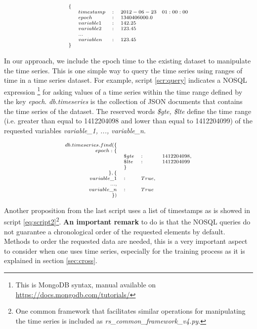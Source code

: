 \begin{equation}
\scriptsize
\label{eq:script}
\begin{array}{llcl}
\{ &  &  &  \\ 
& timestamp & : & 2012-06-23 \quad 01:00:00 \\	
& epoch & : & 1340406000.0 \\	
 & variable1 & : & 142.25 	\\	
 & variable2 & : & 123.45 	\\	
 & ... &  &  	\\	
 & variablen & : & 123.45 	\\
\} & & & \\
\end{array}
\end{equation}

In our approach, we include the epoch time to the existing dataset to manipulate the time series. This is one simple way to query the time series using ranges of time in a time series dataset. For example, script \ref{scr:query} indicates a NOSQL expression \footnote{This is MongoDB syntax, manual available on \url{https://docs.mongodb.com/tutorials/}} for asking values of a time series within the time range defined by the key \textit{epoch}. \textit{db.timeseries} is the collection of JSON documents that contains the time series of the dataset. The reserved words \textit{\$gte, \$lte} define the time range (i.e. greater than equal to 1412204098 and lower than equal to 1412204099) of the requested variables \textit{variable\_1, ..., variable\_n}. 

\begin{equation}
\scriptsize
\label{scr:query}
\begin{array}{rlll}
db.timeseries.find(\{ &  &  &  	\\
	epoch : \{ &&  &			\\
		&  \$gte&:& 1412204098, 	\\
		&    \$lte&:& 1412204099 		\\
		& \}     \\
     	\},\{& & 						\\
	 variable\_1 & : & True, &		\\    
    	..., & &	&			\\
    	variable\_n & : &  True 		\\
    	\}) \\
\end{array}
\end{equation}

Another proposition from the last script uses a list of timestamps as is showed in script \ref{eq:script2}\footnote{One common framework that facilitates similar operations for manipulating the time series is included as \textit{rs\_common\_framework\_v4.py}.}. \textbf{An important remark} to do is that the NOSQL queries do not guarantee a chronological order of the requested elements by default. Methods to order the requested data are needed, this is a very important aspect to consider when one uses time series, especially for the training process as it is explained in section \ref{sec:cross}. 

